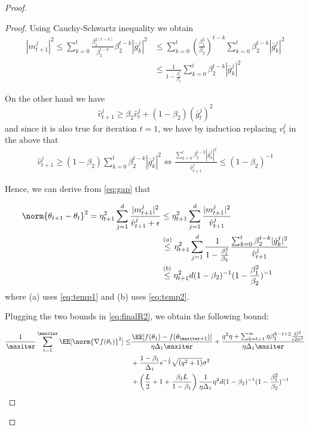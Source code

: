 \documentclass[11pt]{article}
\begin{document}
\begin{proof}
\begin{proof}
Using Cauchy-Schwartz inequality we obtain
\begin{equation}\label{eq:temp1}
\begin{split}
|m_{t+1}^j|^2  \leq \sum_{k=0}^t \frac{\beta_1^{2(t-k)}}{\beta_2^{t-k}}\beta_2^{t-k}|\bar g_k^j|^2 &\leq \sum_{k=0}^t \left(\frac{\beta_1^{2}}{\beta_2}\right)^{t-k}  \sum_{k=0}^t\beta_2^{t-k}|\bar g_k^j|^2\\
&\leq \frac{1}{1 - \frac{\beta_1^{2}}{\beta_2}} \sum_{k=0}^t\beta_2^{t-k}|\bar g_k^j|^2
\end{split}
\end{equation}

On the other hand we have
\begin{equation}
\hat{v}^j_{t+1} \geq \beta_2 \hat{v}^j_{t} + (1-\beta_2) (\bar g_t^j)^2
\end{equation}
and since it is also true for iteration $t=1$, we have by induction replacing $v_t^j$ in the above that 
\begin{equation}\label{eq:temp2}
\begin{split}
\hat{v}^j_{t+1} \geq (1-\beta_2) \sum_{k=0}^t\beta_2^{t-k}|\bar g_k^j|^2 \iff  \frac{\sum_{k=0}^t\beta_2^{t-k}|\bar g_k^j|^2}{ \hat{v}^j_{t+1}} \leq    (1-\beta_2)^{-1}
\end{split}
\end{equation}

Hence, we can derive from \eqref{eq:gap} that

\begin{equation}\label{eq:gap2}
\begin{split}
\norm{\theta_{t+1} - \theta_{t}}^2  = \eta_{t+1}^2 \sum_{j=1}^d  \frac{|m_{t+1}^j|^2}{\hat{v}^j_{t+1} + \epsilon}&\leq  \eta_{t+1}^2 \sum_{j=1}^d  \frac{|m_{t+1}^j|^2}{\hat{v}^j_{t+1}}\\
&\overset{(a)}{\leq}   \eta_{t+1}^2 \sum_{j=1}^d  \frac{1}{1 - \frac{\beta_1^{2}}{\beta_2}} \frac{\sum_{k=0}^t\beta_2^{t-k}|\bar g_k^j|^2}{\hat{v}^j_{t+1}}\\
&\overset{(b)}{\leq} \eta_{t+1}^2 d (1-\beta_2)^{-1} (1 - \frac{\beta_1^{2}}{\beta_2})^{-1}
\end{split}
\end{equation}
where (a) uses \eqref{eq:temp1} and (b) uses \eqref{eq:temp2}.


Plugging the two bounds in \eqref{eq:finalR2}, we obtain the following bound:

\begin{equation}
\begin{split}
 \frac{1}{\maxiter}\sum_{t=1}^{\maxiter } \EE[\norm{\nabla f(\theta_t)}^2] \leq & \frac{\EE[ f(\theta_{1}) - f(\theta_{\maxiter+1})]}{\eta \Delta_1 \maxiter} + \frac{q^2 \eta+ \sum_{k=t+1}^\infty \eta \beta_1^{k-t+2}\frac{G^2 }{\epsilon 2n^2}}{\eta \Delta_1\maxiter}\\
&+\frac{1-\beta_1}{\Delta_1}  \epsilon^{-\frac{1}{2}} \sqrt{(q^2+1)}\sigma^2 \\
& + \left(\frac{L}{2} + 1+ \frac{\beta_1L}{1-\beta_1} \right)\frac{1}{\eta \Delta_1}  \eta^2 d (1-\beta_2)^{-1} (1 - \frac{\beta_1^{2}}{\beta_2})^{-1}
\end{split}
\end{equation}



\end{proof}
\end{proof}
\end{document}
